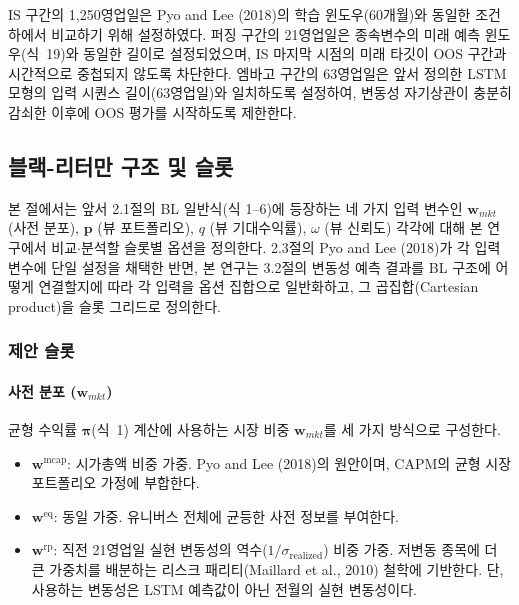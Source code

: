 \documentclass{article}
\begin{document}
IS 구간의 1,250영업일은 Pyo and Lee (2018)의 학습 윈도우(60개월)와 동일한 조건 하에서 비교하기 위해 설정하였다. 퍼징 구간의 21영업일은 종속변수의 미래 예측 윈도우(식~19)와 동일한 길이로 설정되었으며, IS 마지막 시점의 미래 타깃이 OOS 구간과 시간적으로 중첩되지 않도록 차단한다. 엠바고 구간의 63영업일은 앞서 정의한 LSTM 모형의 입력 시퀀스 길이(63영업일)와 일치하도록 설정하여, 변동성 자기상관이 충분히 감쇠한 이후에 OOS 평가를 시작하도록 제한한다.

\subsection{블랙-리터만 구조 및 슬롯}\label{sec:bl}

본 절에서는 앞서 2.1절의 BL 일반식(식 1--6)에 등장하는 네 가지 입력 변수인 $\mathbf{w}_{mkt}$ (사전 분포), $\mathbf{p}$ (뷰 포트폴리오), $q$ (뷰 기대수익률), $\omega$ (뷰 신뢰도) 각각에 대해 본 연구에서 비교$\cdot$분석할 슬롯별 옵션을 정의한다. 2.3절의 Pyo and Lee (2018)가 각 입력 변수에 단일 설정을 채택한 반면, 본 연구는 3.2절의 변동성 예측 결과를 BL 구조에 어떻게 연결할지에 따라 각 입력을 옵션 집합으로 일반화하고, 그 곱집합(Cartesian product)을 슬롯 그리드로 정의한다.

\subsubsection{제안 슬롯}\label{subsubsec:bl_proposed_slot}

\paragraph{사전 분포 ($\mathbf{w}_{mkt}$)}

균형 수익률 $\boldsymbol{\pi}$(식~1) 계산에 사용하는 시장 비중 $\mathbf{w}_{mkt}$를 세 가지 방식으로 구성한다.

\begin{itemize}
    \item $\mathbf{w}^{\mathrm{mcap}}$: 시가총액 비중 가중. Pyo and Lee (2018)의 원안이며, CAPM의 균형 시장 포트폴리오 가정에 부합한다.
    \item $\mathbf{w}^{\mathrm{eq}}$: 동일 가중. 유니버스 전체에 균등한 사전 정보를 부여한다.
    \item $\mathbf{w}^{\mathrm{rp}}$: 직전 21영업일 실현 변동성의 역수($1/\sigma_{\mathrm{realized}}$) 비중 가중. 저변동 종목에 더 큰 가중치를 배분하는 리스크 패리티(Maillard et al., 2010) 철학에 기반한다. 단, 사용하는 변동성은 LSTM 예측값이 아닌 전월의 실현 변동성이다.
\end{itemize}
\end{document}
